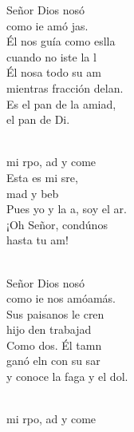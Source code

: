 \documentclass[12pt]{article}
\begin{document}
\begin{multicols*}{2}
\begin{cancion}%
	 Señor Dios nosó\\
	como ie amó jas. \\
	Él nos guía como eslla\\
	cuando no iste la l\\
	Él nosa todo su am\\
	mientras fracción delan.\\
	Es el pan de la amiad,\\
	el pan de Di.   \\\jump\\
	\begin{chorus}%
	 mi rpo, ad y come\\
	Esta es mi sre,\\
	mad y beb\\
	Pues yo y la a, soy el ar.\\
	¡Oh Señor, condúnos \\
	hasta tu am!   \\
	\end{chorus}%
	\jump\\
	 Señor Dios nosó\\
	como ie nos amóamás.\\
	Sus paisanos le cren\\
	hijo den trabajad\\
	Como dos. Él tamn \\
	ganó eln con su sar\\
	y conoce la faga y el dol. \\\jump\\
	\begin{chorus}%
	 mi rpo, ad y come\\

\end{chorus}
\end{cancion}
\end{multicols*}
\end{document}

